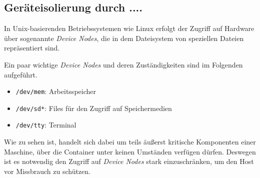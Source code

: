 \documentclass[../main.tex]{subfiles}
\begin{document}

			\cite[S.4]{dockerSec1}


    \subsection{Geräteisolierung durch ....}

			In Unix-basierenden Betriebssystemen wie Linux erfolgt der Zugriff auf Hardware über sogenannte \emph{Device Nodes}, die in dem Dateisystem von speziellen Dateien repräsentiert sind.

			Ein paar wichtige \emph{Device Nodes} und deren Zuständigkeiten sind im Folgenden aufgeführt.

			\begin{itemize}
				\item \texttt{/dev/mem}: Arbeitsspeicher
				\item \texttt{/dev/sd*}: Files für den Zugriff auf Speichermedien
				\item \texttt{/dev/tty}: Terminal
			\end{itemize}

			Wie zu sehen ist, handelt sich dabei um teils äußerst kritische Komponenten einer Maschine, über die Container unter keinen Umständen verfügen dürfen. Deswegen ist es notwendig den Zugriff auf \emph{Device Nodes} stark einzuschränken, um den Host vor Missbrauch zu schützen.

\end{document}
